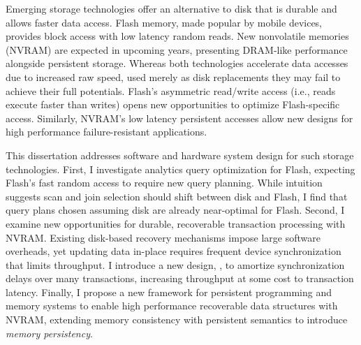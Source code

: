 Emerging storage technologies offer an alternative to disk that is durable and allows faster data access.
Flash memory, made popular by mobile devices, provides block access with low latency random reads.
New nonvolatile memories (NVRAM) are expected in upcoming years, presenting DRAM-like performance alongside persistent storage.
Whereas both technologies accelerate data accesses due to increased raw speed, used merely as disk replacements they may fail to achieve their full potentials.
Flash's asymmetric read/write access (i.e., reads execute faster than writes) opens new opportunities to optimize Flash-specific access.
Similarly, NVRAM's low latency persistent accesses allow new designs for high performance failure-resistant applications.

This dissertation addresses software and hardware system design for such storage technologies.
First, I investigate analytics query optimization for Flash, expecting Flash's fast random access to require new query planning.
While intuition suggests scan and join selection should shift between disk and Flash, I find that query plans chosen assuming disk are already near-optimal for Flash.
Second, I examine new opportunities for durable, recoverable transaction processing with NVRAM.
Existing disk-based recovery mechanisms impose large software overheads, yet updating data in-place requires frequent device synchronization that limits throughput.
I introduce a new design, \GroupCommit, to amortize synchronization delays over many transactions, increasing throughput at some cost to transaction latency.
Finally, I propose a new framework for persistent programming and memory systems to enable high performance recoverable data structures with NVRAM, extending memory consistency with persistent semantics to introduce \emph{memory persistency}.
